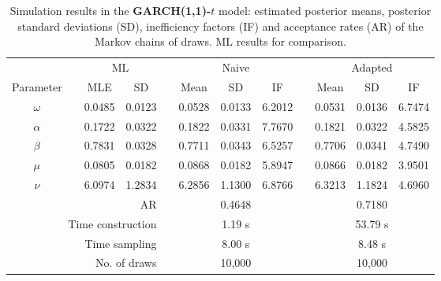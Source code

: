 { \renewcommand{\arraystretch}{1.3} 
\begin{table}[h] 
\centering 
\caption{Simulation results in the \textbf{GARCH(1,1)-$t$} model: estimated posterior means, posterior standard deviations (SD), inefficiency factors (IF) and acceptance rates (AR) of the Markov chains of draws. ML results for comparison.} 
\label{tab:posterior_t_garch2_noS} 
\begin{tabular}{cc rr c rrr c rrr}  
 & & \multicolumn{2}{c}{ML} & & \multicolumn{3}{c}{Naive} & & \multicolumn{3}{c}{Adapted} \\  \cline{3-4} \cline{6-8} \cline{10-12} 
 Parameter & &  \multicolumn{1}{c}{MLE} &  \multicolumn{1}{c}{SD}  & &  \multicolumn{1}{c}{Mean} &  \multicolumn{1}{c}{SD} &  \multicolumn{1}{c}{IF} & &  \multicolumn{1}{c}{Mean} &  \multicolumn{1}{c}{SD} &  \multicolumn{1}{c}{IF} \\ \cline{1-1}  \cline{3-4} \cline{6-8} \cline{10-12}  
$\omega$ & & 0.0485 &  0.0123 & & 0.0528 &  0.0133 &  6.2012 & & 0.0531 &  0.0136 &  6.7474 \\ [1ex] 
$\alpha$ & & 0.1722 &  0.0322 & & 0.1822 &  0.0331 &  7.7670 & & 0.1821 &  0.0322 &  4.5825 \\ [1ex] 
$\beta$ & & 0.7831 &  0.0328 & & 0.7711 &  0.0343 &  6.5257 & & 0.7706 &  0.0341 &  4.7490 \\ [1ex] 
$\mu$ & & 0.0805 &  0.0182 & & 0.0868 &  0.0182 &  5.8947 & & 0.0866 &  0.0182 &  3.9501 \\ [1ex] 
$\nu$ & & 6.0974 &  1.2834 & & 6.2856 &  1.1300 &  6.8766 & & 6.3213 &  1.1824 &  4.6960 \\ [1ex] 
\cline{1-1}  \cline{3-4} \cline{6-8} \cline{10-12}   
\multicolumn{4}{r}{AR} & &\multicolumn{3}{c}{0.4648} &&\multicolumn{3}{c}{0.7180} \\ 
  \cline{1-4} \cline{6-8} \cline{10-12}  
 \multicolumn{4}{r}{Time construction} & &\multicolumn{3}{c}{1.19 s} &&\multicolumn{3}{c}{53.79 s} \\ 
   \multicolumn{4}{r}{Time sampling} & &\multicolumn{3}{c}{8.00 s} &&\multicolumn{3}{c}{8.48 s} \\ 
   \multicolumn{4}{r}{No. of draws }& &\multicolumn{3}{c}{10,000} &&\multicolumn{3}{c}{10,000} \\ 
  \cline{1-4} \cline{6-8} \cline{10-12} 
\hline 
\end{tabular} 
\end{table} 
} 
